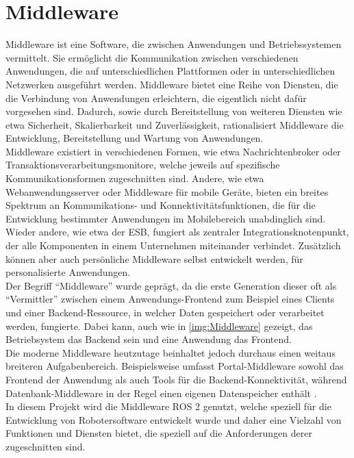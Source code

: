 \section{Middleware}\label{sec:Middleware}
Middleware ist eine Software, die zwischen Anwendungen und Betriebssystemen vermittelt. Sie ermöglicht die Kommunikation zwischen verschiedenen Anwendungen, die auf unterschiedlichen Plattformen oder in unterschiedlichen Netzwerken ausgeführt werden. Middleware bietet eine Reihe von Diensten, die die Verbindung von Anwendungen erleichtern, die eigentlich nicht dafür vorgesehen sind. Dadurch, sowie durch Bereitstellung von weiteren Diensten wie etwa Sicherheit, Skalierbarkeit und Zuverlässigkeit, rationalisiert Middleware die Entwicklung, Bereitstellung und Wartung von Anwendungen.\\
Middleware existiert in verschiedenen Formen, wie etwa Nachrichtenbroker oder Transaktionsverarbeitungsmonitore, welche jeweils auf spezifische Kommunikationsformen zugeschnitten sind. Andere, wie etwa Webanwendungsserver oder Middleware für mobile Geräte, bieten ein breites Spektrum an Kommunikations- und Konnektivitätsfunktionen, die für die Entwicklung bestimmter Anwendungen im Mobilebereich unabdinglich sind. Wieder andere, wie etwa der \ac{ESB}, fungiert als zentraler Integrationsknotenpunkt, der alle Komponenten in einem Unternehmen miteinander verbindet. Zusätzlich können aber auch persönliche Middleware selbst entwickelt werden, für personalisierte Anwendungen.\\
Der Begriff ``Middleware'' wurde geprägt, da die erste Generation dieser oft als ``Vermittler'' zwischen einem Anwendungs-Frontend zum Beispiel eines Clients und einer Backend-Ressource, in welcher Daten gespeichert oder verarbeitet werden, fungierte. Dabei kann, auch wie in \autoref{img:Middleware} gezeigt, das Betriebsystem das Backend sein und eine Anwendung das Frontend.\\
Die moderne Middleware heutzutage beinhaltet jedoch durchaus einen weitaus breiteren Aufgabenbereich. Beispielsweise umfasst Portal-Middleware sowohl das Frontend der Anwendung als auch Tools für die Backend-Konnektivität, während Datenbank-Middleware in der Regel einen eigenen Datenspeicher enthält \cite{AzureMiddleware}.\\
In diesem Projekt wird die Middleware \ac{ROS} 2 genutzt, welche speziell für die Entwicklung von Robotersoftware entwickelt wurde und daher eine Vielzahl von Funktionen und Diensten bietet, die speziell auf die Anforderungen derer zugeschnitten sind.\\

